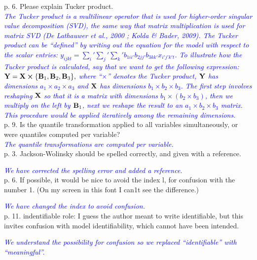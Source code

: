 p. 6. Please explain Tucker product. \\

\textcolor{blue}{\emph{
	The Tucker product is a multilinear operator that is used for higher-order singular value decomposition (SVD), the same way that matrix multiplication is used for matrix SVD (De Lathauwer et al., 2000 ; Kolda \& Bader, 2009). The Tucker product can be ``defined'' by writing out the equation for the model with respect to the scalar entries: $y_{ijkt} = \sum_i' \sum_j' \sum_k' b_{1ii'} b_{2jj'} b_{3kk'} x_{i'j'k't}$. To illustrate how the Tucker product is calculated, say that we want to get the following expression: ${\mathbf Y} = {\mathbf X} \boldsymbol{\times} \{ {\mathbf B}_{1}, {\mathbf B}_{2}, {\mathbf B}_{3}\},$ where ``$\boldsymbol{\times}$'' denotes the Tucker product, ${\mathbf Y}$ has dimensions $a_{1} \times a_{2} \times a_{3}$ and ${\mathbf X}$ has dimensions $b_{1} \times b_{2} \times b_{3}$. The first step involves reshaping ${\mathbf X}$ so that it is a matrix with  dimensions $b_{1} \times (b_{2} \times b_{3})$, then we multiply on the left by ${\mathbf B}_{1}$, next we reshape the result to an $a_{1} \times b_{2} \times b_{3}$ matrix. This procedure would be applied iteratively among the remaining dimensions. 
	}} \\

p. 9. Is the quantile transformation applied to all variables simultaneously, or were quantiles computed per variable? \\

\textcolor{blue}{\emph{
	The quantile transformations are computed per variable.
}} \\

p. 3. Jackson-Wolinsky should be spelled correctly, and given with a reference.

\textcolor{blue}{\emph{
	We have corrected the spelling error and added a reference.
}} \\

p. 6. If possible, it would be nice to avoid the index l, for confusion with the number 1. (On my screen in this font I can1t see the difference.)

\textcolor{blue}{\emph{
	We have changed the index to avoid confusion. 
}} \\

p. 11. indentifiable role: I guess the author meant to write identifiable, but this invites confusion with model identifiability, which cannot have been intended.

\textcolor{blue}{\emph{
	We understand the possibility for confusion so we replaced ``identifiable'' with ``meaningful''.
}} \\
